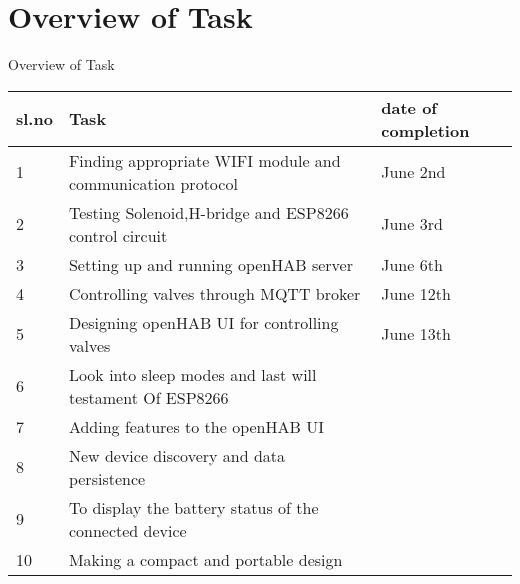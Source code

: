 \documentclass[10pt, a4paper]{beamer}
\begin{document}
\section{Overview of Task}
\begin{frame}{Overview of Task}
        \centering 
	\begin{tabular}{|m{0.6cm}|m{6cm}|m{2cm}|}
	\hline
        sl.no& \centering Task & date of completion \\
        \hline
        1 & Finding appropriate WIFI module and communication protocol & June 2nd \\ \hline
        2 & Testing Solenoid,H-bridge and ESP8266 control circuit & June 3rd \\ \hline
        3 & Setting up and running openHAB server & June 6th \\ \hline
        4 & Controlling valves through MQTT broker & June 12th \\ \hline
        5 & Designing openHAB UI for controlling valves & June 13th \\ \hline
        6 & Look into sleep modes and last will testament Of ESP8266 &  \\ \hline
        7 & Adding features to the openHAB UI &  \\ \hline
        8 & New device discovery and data persistence & \\ \hline
        9 & To display the battery status of the connected device & \\ \hline 
        10 & Making a compact and portable design & \\ \hline
        \end{tabular}
\end{frame}
\end{document}
